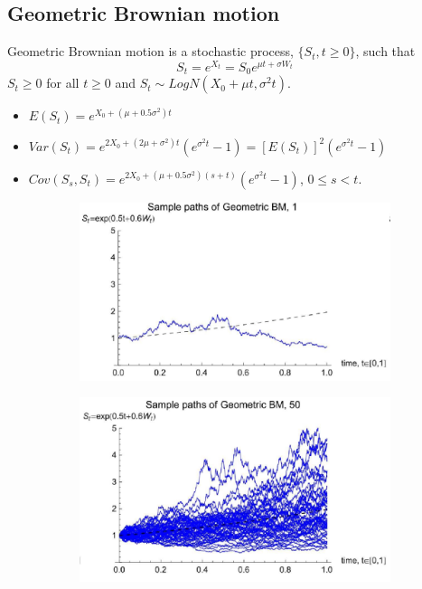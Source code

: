\documentclass[11pt,a4paper]{book}
\theoremstyle{definition}\newtheorem{definition}{Definition}
\theoremstyle{definition}\newtheorem{fact}{Fact}
\theoremstyle{definition}\newtheorem{remark}{Remark}
\theoremstyle{definition}\newtheorem{ex}{Ex.}
\theoremstyle{definition}\newtheorem{project}{Project}
\theoremstyle{definition}\newtheorem{problem}{Problem}
\theoremstyle{definition}\newtheorem{example}{Example}
\numberwithin{theorem}{section}
\numberwithin{corollary}{chapter}
\numberwithin{assumption}{chapter}
\numberwithin{definition}{chapter}
\numberwithin{prop}{chapter}
\numberwithin{notation}{chapter}
\numberwithin{problem}{chapter}
\numberwithin{example}{chapter}
\numberwithin{fact}{chapter}
\numberwithin{ex}{chapter}
\begin{document}
\subsection{Geometric Brownian motion}
Geometric Brownian motion is a stochastic process, $\{S_t, t \geq 0\}$, such that
$$ S_t = e^{X_t} = S_0 e^{\mu t + \sigma W_t} $$
$ S_t \geq 0 $ for all $t \geq 0$ and $S_t \sim LogN(X_0+\mu t, \sigma^2 t)$.
\begin{itemize}
\item $E(S_t) = e^{X_0+(\mu+0.5\sigma^2)t}$
\item $Var(S_t) = e^{2X_0 + (2\mu + \sigma^2)t} (e^{\sigma^2 t} -1) = [E(S_t)]^2 (e^{\sigma^2 t}-1)$
\item $Cov(S_s,S_t) = e^{2X_0 + (\mu + 0.5\sigma^2)(s+t)}(e^{\sigma^2 t} -1)$, $0\leq s < t$.
\end{itemize}

\begin{figure}[H]
	\begin{subfigure}{0.5\textwidth}
		\centering
		\includegraphics[scale=0.5]{Chapter 1/Chapter1_6.png}
	\end{subfigure}
	\begin{subfigure}{0.5\textwidth}
		\centering
		\includegraphics[scale=0.5]{Chapter 1/Chapter1_7.png}
	\end{subfigure}
\end{figure}
\end{document}
